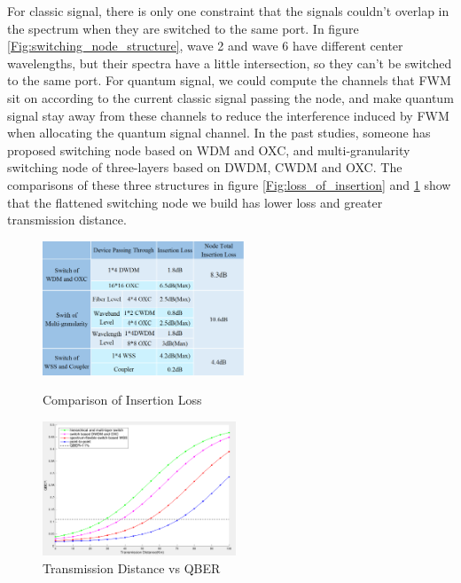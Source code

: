 \documentclass[letterpaper,10pt]{article}
\begin{document}
For classic signal, there is only one constraint that the signals couldn't overlap in the spectrum when they are switched to the same port. In figure \ref{Fig:switching_node_structure}, wave 2 and wave 6 have different center wavelengths, but their spectra have a little intersection, so they can't be switched to the same port. For quantum signal, we could compute the channels that FWM sit on according to the current classic signal passing the node, and make quantum signal stay away from these channels to reduce the interference induced by FWM when allocating the quantum signal channel. In the past studies, someone has proposed switching node based on WDM and OXC, and multi-granularity switching node of three-layers based on DWDM, CWDM and OXC. The comparisons of these three structures in figure \ref{Fig:loss_of_insertion} and \ref{Fig:distance_vs_qber} show that the flattened switching node we build has lower loss and greater transmission distance.

\begin{figure}[!htb]
   \begin{minipage}{0.48\textwidth}
     \centering
     \includegraphics[height= 4cm,width=.9\linewidth]{comparison_of_three_kind_of_nodes_prety}
     \caption{Comparison of Insertion Loss} 
     \label{Fig:loss_of_insertion}
   \end{minipage}\hfill
   \begin{minipage}{0.48\textwidth}
     \centering
     \includegraphics[height= 4cm,width=.9\linewidth]{distance_of_transmission_with_label}
     \caption{Transmission Distance vs QBER} 
     \label{Fig:distance_vs_qber}
   \end{minipage}
\end{figure}
\end{document}
